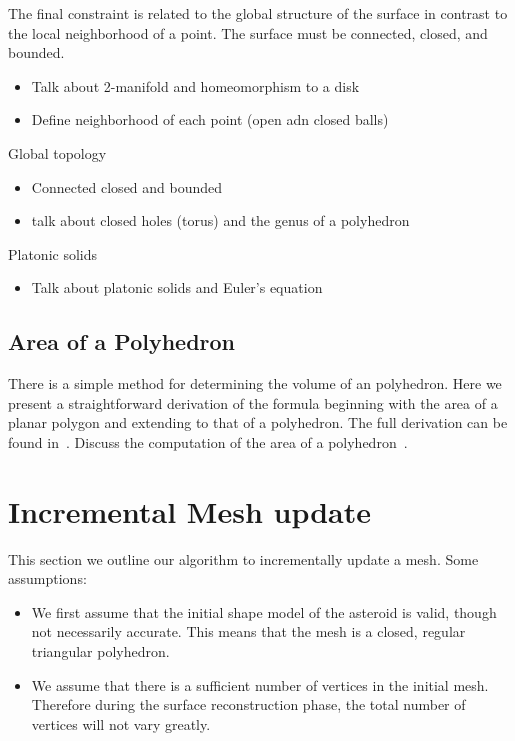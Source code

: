 The final constraint is related to the global structure of the surface in contrast to the local neighborhood of a point.
The surface must be connected, closed, and bounded.

\begin{itemize}
    \item Talk about 2-manifold and homeomorphism to a disk
    \item Define neighborhood of each point (open adn closed balls)
\end{itemize}

Global topology
\begin{itemize}
    \item Connected closed and bounded
    \item talk about closed holes (torus) and the genus of a polyhedron
\end{itemize}

Platonic solids
\begin{itemize}
    \item Talk about platonic solids and Euler's equation
\end{itemize}

\subsection{Area of a Polyhedron}
There is a simple method for determining the volume of an polyhedron.
Here we present a straightforward derivation of the formula beginning with the area of a planar polygon and extending to that of a polyhedron.
The full derivation can be found in~\citeauthor{newson1899}.
Discuss the computation of the area of a polyhedron~\cite{newson1899}.
\section{Incremental Mesh update}

This section we outline our algorithm to incrementally update a mesh. 
Some assumptions:

\begin{itemize}
    \item We first assume that the initial shape model of the asteroid is valid, though not necessarily accurate.
        This means that the mesh is a closed, regular triangular polyhedron.
    \item We assume that there is a sufficient number of vertices in the initial mesh. 
        Therefore during the surface reconstruction phase, the total number of vertices will not vary greatly.
\end{itemize}


